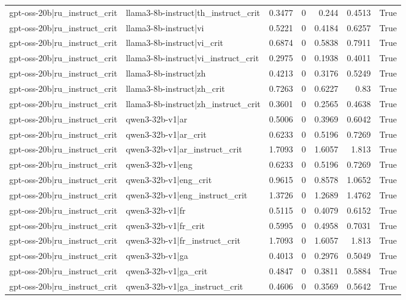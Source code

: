 \begin{table}
\begin{tabular}{l l r r r r l}
gpt-oss-20b|ru_instruct_crit & llama3-8b-instruct|th_instruct_crit & 0.3477 & 0 & 0.244 & 0.4513 & True \\
gpt-oss-20b|ru_instruct_crit & llama3-8b-instruct|vi & 0.5221 & 0 & 0.4184 & 0.6257 & True \\
gpt-oss-20b|ru_instruct_crit & llama3-8b-instruct|vi_crit & 0.6874 & 0 & 0.5838 & 0.7911 & True \\
gpt-oss-20b|ru_instruct_crit & llama3-8b-instruct|vi_instruct_crit & 0.2975 & 0 & 0.1938 & 0.4011 & True \\
gpt-oss-20b|ru_instruct_crit & llama3-8b-instruct|zh & 0.4213 & 0 & 0.3176 & 0.5249 & True \\
gpt-oss-20b|ru_instruct_crit & llama3-8b-instruct|zh_crit & 0.7263 & 0 & 0.6227 & 0.83 & True \\
gpt-oss-20b|ru_instruct_crit & llama3-8b-instruct|zh_instruct_crit & 0.3601 & 0 & 0.2565 & 0.4638 & True \\
gpt-oss-20b|ru_instruct_crit & qwen3-32b-v1|ar & 0.5006 & 0 & 0.3969 & 0.6042 & True \\
gpt-oss-20b|ru_instruct_crit & qwen3-32b-v1|ar_crit & 0.6233 & 0 & 0.5196 & 0.7269 & True \\
gpt-oss-20b|ru_instruct_crit & qwen3-32b-v1|ar_instruct_crit & 1.7093 & 0 & 1.6057 & 1.813 & True \\
gpt-oss-20b|ru_instruct_crit & qwen3-32b-v1|eng & 0.6233 & 0 & 0.5196 & 0.7269 & True \\
gpt-oss-20b|ru_instruct_crit & qwen3-32b-v1|eng_crit & 0.9615 & 0 & 0.8578 & 1.0652 & True \\
gpt-oss-20b|ru_instruct_crit & qwen3-32b-v1|eng_instruct_crit & 1.3726 & 0 & 1.2689 & 1.4762 & True \\
gpt-oss-20b|ru_instruct_crit & qwen3-32b-v1|fr & 0.5115 & 0 & 0.4079 & 0.6152 & True \\
gpt-oss-20b|ru_instruct_crit & qwen3-32b-v1|fr_crit & 0.5995 & 0 & 0.4958 & 0.7031 & True \\
gpt-oss-20b|ru_instruct_crit & qwen3-32b-v1|fr_instruct_crit & 1.7093 & 0 & 1.6057 & 1.813 & True \\
gpt-oss-20b|ru_instruct_crit & qwen3-32b-v1|ga & 0.4013 & 0 & 0.2976 & 0.5049 & True \\
gpt-oss-20b|ru_instruct_crit & qwen3-32b-v1|ga_crit & 0.4847 & 0 & 0.3811 & 0.5884 & True \\
gpt-oss-20b|ru_instruct_crit & qwen3-32b-v1|ga_instruct_crit & 0.4606 & 0 & 0.3569 & 0.5642 & True \\

\end{tabular}
\end{table}
